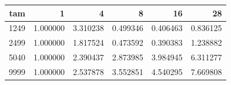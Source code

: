 \begin{tabular}{rrrrrr}
\toprule
tam & 1 & 4 & 8 & 16 & 28 \\
\midrule
1249 & 1.000000 & 3.310238 & 0.499346 & 0.406463 & 0.836125 \\
2499 & 1.000000 & 1.817524 & 0.473592 & 0.390383 & 1.238882 \\
5040 & 1.000000 & 2.390437 & 2.873985 & 3.984945 & 6.311277 \\
9999 & 1.000000 & 2.537878 & 3.552851 & 4.540295 & 7.669808 \\
\bottomrule
\end{tabular}
